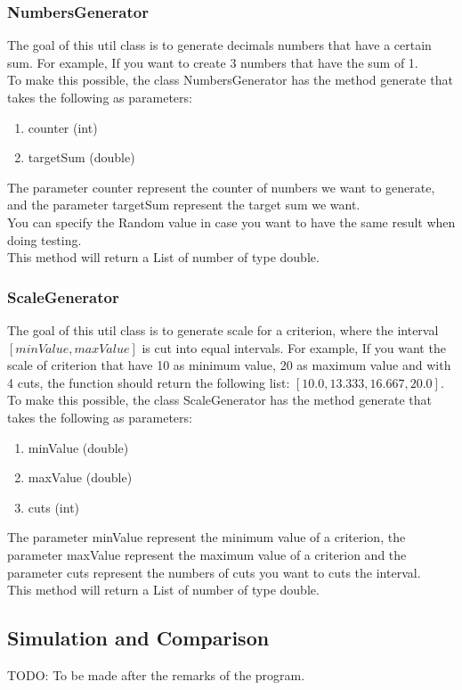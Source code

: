 \documentclass{report}
\begin{document}
\subsubsection{NumbersGenerator}
The goal of this util class is to generate decimals numbers that have a certain sum. For example, If you want to create 3 numbers that have the sum of 1. \\
To make this possible, the class NumbersGenerator has the method generate that takes the following as parameters: 
\begin{enumerate}
\item counter (int)
\item targetSum (double)
\end{enumerate} 
The parameter counter represent the counter of numbers we want to generate, and the parameter targetSum represent the target sum we want. \\
You can specify the Random value in case you want to have the same result when doing testing. \\
This method will return a List of number of type double. 

\subsubsection{ScaleGenerator}
The goal of this util class is to generate scale for a criterion, where the interval $[minValue, maxValue]$ is cut into equal intervals. For example, If you want the scale of criterion that have 10 as minimum value, 20 as maximum value and with 4 cuts, the function should return the following list: $[10.0, 13.333, 16.667, 20.0]$.\\
To make this possible, the class ScaleGenerator has the method generate that takes the following as parameters: 
\begin{enumerate}
\item minValue (double)
\item maxValue (double)
\item cuts (int)
\end{enumerate} 
The parameter minValue represent the minimum value of a criterion, the parameter maxValue represent the maximum value of a criterion and the parameter cuts represent the numbers of cuts you want to cuts the interval.  \\
This method will return a List of number of type double. 

\subsection{Simulation and Comparison}
TODO: To be made after the remarks of the program.
\end{document}
